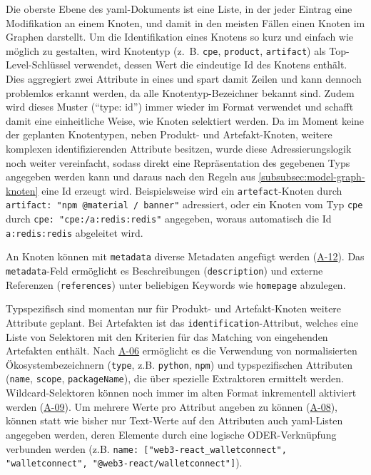 Die oberste Ebene des \acrshort{yaml}-Dokuments ist eine Liste, in der jeder Eintrag eine Modifikation an einem Knoten, und damit in den meisten Fällen einen Knoten im Graphen darstellt.
Um die Identifikation eines Knotens so kurz und einfach wie möglich zu gestalten, wird Knotentyp (z.\ B. \texttt{cpe}, \texttt{product}, \texttt{artifact}) als Top-Level-Schlüssel verwendet, dessen Wert die eindeutige Id des Knotens enthält.
Dies aggregiert zwei Attribute in eines und spart damit Zeilen und kann dennoch problemlos erkannt werden, da alle Knotentyp-Bezeichner bekannt sind.
Zudem wird dieses Muster (\enquote{type: id}) immer wieder im Format verwendet und schafft damit eine einheitliche Weise, wie Knoten selektiert werden.
Da im Moment keine der geplanten Knotentypen, neben Produkt- und Artefakt-Knoten, weitere komplexen identifizierenden Attribute besitzen, wurde diese Adressierungslogik noch weiter vereinfacht, sodass direkt eine Repräsentation des gegebenen Typs angegeben werden kann und daraus nach den Regeln aus \autoref{subsubsec:model-graph-knoten} eine Id erzeugt wird.
Beispielsweise wird ein \texttt{artefact}-Knoten durch \texttt{artifact: "npm @material / banner"} adressiert, oder ein Knoten vom Typ \texttt{cpe} durch \texttt{cpe: "cpe:/a:redis:redis"} angegeben, woraus automatisch die Id \texttt{a:redis:redis} abgeleitet wird.

An Knoten können mit \texttt{metadata} diverse Metadaten angefügt werden (\hyperref[subsec:req-reason-format]{A-12}).
Das \texttt{metadata}-Feld ermöglicht es Beschreibungen (\texttt{description}) und externe Referenzen (\texttt{references}) unter beliebigen Keywords wie \texttt{homepage} abzulegen.

Typspezifisch sind momentan nur für Produkt- und Artefakt-Knoten weitere Attribute geplant.
Bei Artefakten ist das \texttt{identification}-Attribut, welches eine Liste von Selektoren mit den Kriterien für das Matching von eingehenden Artefakten enthält.
Nach \hyperref[subsec:req-type-specific-matching]{A-06} ermöglicht es die Verwendung von normalisierten Ökosystembezeichnern (\texttt{type}, z.B. \texttt{python}, \texttt{npm}) und typspezifischen Attributen (\texttt{name}, \texttt{scope}, \texttt{packageName}), die über spezielle Extraktoren ermittelt werden.
Wildcard-Selektoren können noch immer im alten Format inkrementell aktiviert werden (\hyperref[subsec:req-regex-support]{A-09}).
Um mehrere Werte pro Attribut angeben zu können (\hyperref[subsec:req-multiple-attribute-values]{A-08}), können statt wie bisher nur Text-Werte auf den Attributen auch \acrshort{yaml}-Listen angegeben werden, deren Elemente durch eine logische ODER-Verknüpfung verbunden werden (z.B. \texttt{name: ["web3-react\_walletconnect", "walletconnect", "@web3-react/walletconnect"]}).

